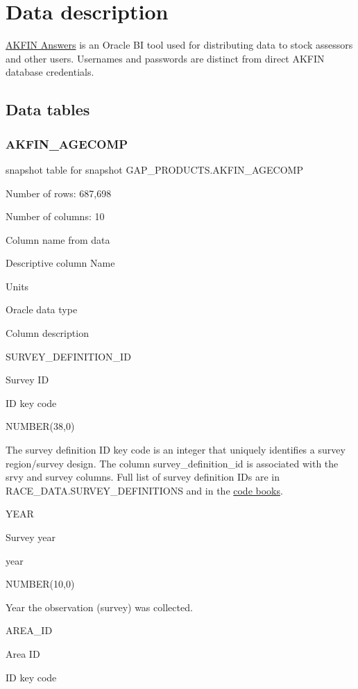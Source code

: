 \documentclass[
  letterpaper,
  oneside,
  open=any]{scrbook}
\begin{document}
\chapter{Data description}\label{data-description-2}

\href{https://akfin.psmfc.org/akfin-answers/}{AKFIN Answers} is an
Oracle BI tool used for distributing data to stock assessors and other
users. Usernames and passwords are distinct from direct AKFIN database
credentials.

\section{Data tables}\label{data-tables-1}

\subsection{AKFIN\_AGECOMP}\label{akfin_agecomp}

snapshot table for snapshot GAP\_PRODUCTS.AKFIN\_AGECOMP

Number of rows: 687,698

Number of columns: 10

Column name from data

Descriptive column Name

Units

Oracle data type

Column description

SURVEY\_DEFINITION\_ID

Survey ID

ID key code

NUMBER(38,0)

The survey definition ID key code is an integer that uniquely identifies
a survey region/survey design. The column survey\_definition\_id is
associated with the srvy and survey columns. Full list of survey
definition IDs are in RACE\_DATA.SURVEY\_DEFINITIONS and in the
\href{https://www.fisheries.noaa.gov/resource/document/groundfish-survey-species-code-manual-and-data-codes-manual}{code
books}.

YEAR

Survey year

year

NUMBER(10,0)

Year the observation (survey) was collected.

AREA\_ID

Area ID

ID key code
\end{document}
